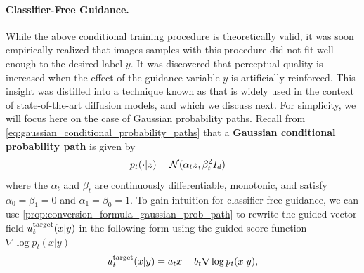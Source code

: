 \paragraph{Classifier-Free Guidance.} While the above conditional training procedure is theoretically valid, it was soon empirically realized that images samples with this procedure did not fit well enough to the desired label $y$. It was discovered that perceptual quality is increased when the effect of the guidance variable $y$ is artificially reinforced. This insight was distilled into a technique known as  that is widely used in the context of state-of-the-art diffusion models, and which we discuss next. For simplicity, we will focus here on the case of Gaussian probability paths. Recall from \cref{eq:gaussian_conditional_probability_paths}
 that a \textbf{Gaussian conditional probability path} is given by
\begin{align*}
    p_t(\cdot|z) &= \mathcal{N}(\alpha_t z,\beta_t^2 I_d)
\end{align*}
where the  $\alpha_t$ and $\beta_t$ are continuously differentiable, monotonic, and satisfy $\alpha_0 = \beta_1 = 0$ and $\alpha_1 = \beta_0 = 1$. 
To gain intuition for classifier-free guidance, we can use \cref{prop:conversion_formula_gaussian_prob_path} to rewrite the guided vector field $u^{\text{target}}_t(x|y)$ in the following form using the guided score function $\nabla\log p_t(x|y)$
\begin{equation}
    u^{\text{target}}_t(x|y) = a_tx + b_t\nabla \log p_t(x|y),
\end{equation}
